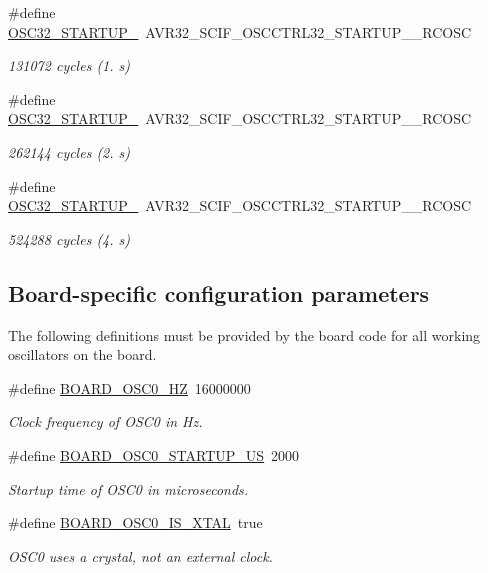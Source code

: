 \begin{DoxyCompactItemize}
\#define \hyperlink{group__osc__group_ga1a10117ee43eccb8581f270b6c7bbb3e}{\-O\-S\-C32\-\_\-\-S\-T\-A\-R\-T\-U\-P\-\_}~\-A\-V\-R32\-\_\-\-S\-C\-I\-F\-\_\-\-O\-S\-C\-C\-T\-R\-L32\-\_\-\-S\-T\-A\-R\-T\-U\-P\-\_\-\_\-\-R\-C\-O\-S\-C
\begin{DoxyCompactList}\small\item\em 131072 cycles (1. s) \end{DoxyCompactList}\item 
\#define \hyperlink{group__osc__group_gaa89eb0780af73b41a344ea4c40cc9918}{\-O\-S\-C32\-\_\-\-S\-T\-A\-R\-T\-U\-P\-\_}~\-A\-V\-R32\-\_\-\-S\-C\-I\-F\-\_\-\-O\-S\-C\-C\-T\-R\-L32\-\_\-\-S\-T\-A\-R\-T\-U\-P\-\_\-\_\-\-R\-C\-O\-S\-C
\begin{DoxyCompactList}\small\item\em 262144 cycles (2. s) \end{DoxyCompactList}\item 
\#define \hyperlink{group__osc__group_gaaa1f456c1e3ff9c33e290314bdd4e3dd}{\-O\-S\-C32\-\_\-\-S\-T\-A\-R\-T\-U\-P\-\_}~\-A\-V\-R32\-\_\-\-S\-C\-I\-F\-\_\-\-O\-S\-C\-C\-T\-R\-L32\-\_\-\-S\-T\-A\-R\-T\-U\-P\-\_\-\_\-\-R\-C\-O\-S\-C
\begin{DoxyCompactList}\small\item\em 524288 cycles (4. s) \end{DoxyCompactList}\end{DoxyCompactItemize}
\subsection*{\-Board-\/specific configuration parameters}
\label{_amgrpdbab1d69166943b607e99f47d307d11a}%
 \-The following definitions must be provided by the board code for all working oscillators on the board. \begin{DoxyCompactItemize}
\item 
\#define \hyperlink{group__osc__group_gab0552386a036eecb8cc8acf85e317e1e}{\-B\-O\-A\-R\-D\-\_\-\-O\-S\-C0\-\_\-\-H\-Z}~16000000
\begin{DoxyCompactList}\small\item\em \-Clock frequency of \-O\-S\-C0 in \-Hz. \end{DoxyCompactList}\item 
\#define \hyperlink{group__osc__group_gaf840954b71d416fe61e409477c533d52}{\-B\-O\-A\-R\-D\-\_\-\-O\-S\-C0\-\_\-\-S\-T\-A\-R\-T\-U\-P\-\_\-\-U\-S}~2000
\begin{DoxyCompactList}\small\item\em \-Startup time of \-O\-S\-C0 in microseconds. \end{DoxyCompactList}\item 
\#define \hyperlink{group__osc__group_ga90710bf923af394fb63c2c80755bff25}{\-B\-O\-A\-R\-D\-\_\-\-O\-S\-C0\-\_\-\-I\-S\-\_\-\-X\-T\-A\-L}~true
\begin{DoxyCompactList}\small\item\em \-O\-S\-C0 uses a crystal, not an external clock. \end{DoxyCompactList}\end{DoxyCompactItemize}
